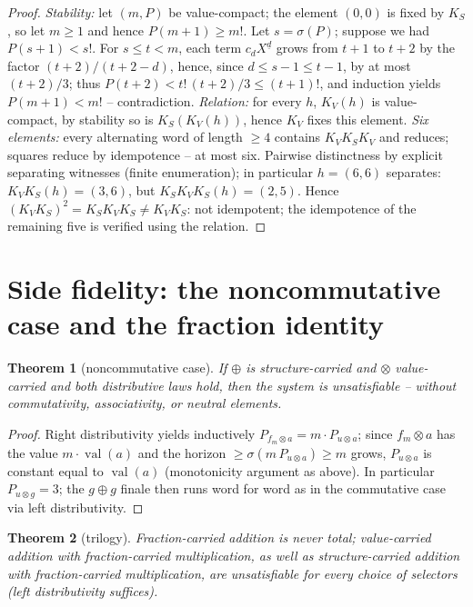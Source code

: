 \documentclass[11pt]{article}
\newtheorem{satz}{Theorem}[section]
\theoremstyle{definition}
\theoremstyle{remark}
\newcommand{\val}{\operatorname{val}}
\newcommand{\ff}[2]{#1^{\underline{#2}}}
\newcommand{\KV}{K_V}
\newcommand{\KS}{K_S}
\begin{document}
\begin{proof}
\emph{Stability:} let $(m,P)$ be value-compact; the element
$(0,0)$ is fixed by $\KS$, so let $m\ge1$ and hence
$P(m{+}1)\ge m!$. Let $s=\sigma(P)$; suppose we had
$P(s{+}1)<s!$. For $s\le t<m$, each term $c_d\ff Xd$ grows from
$t{+}1$ to $t{+}2$ by the factor $(t{+}2)/(t{+}2{-}d)$, hence,
since $d\le s{-}1\le t{-}1$, by at most $(t{+}2)/3$; thus
$P(t{+}2)<t!\,(t{+}2)/3\le(t{+}1)!$, and induction yields
$P(m{+}1)<m!$ -- contradiction.
\emph{Relation:} for every $h$, $\KV(h)$ is value-compact, by
stability so is $\KS(\KV(h))$, hence $\KV$ fixes this element.
\emph{Six elements:} every alternating word of length $\ge4$
contains $\KV\KS\KV$ and reduces; squares reduce by idempotence
-- at most six. Pairwise distinctness by explicit separating
witnesses (finite enumeration); in particular $h=(6,6)$
separates: $\KV\KS(h)=(3,6)$, but $\KS\KV\KS(h)=(2,5)$. Hence
$(\KV\KS)^2=\KS\KV\KS\ne\KV\KS$: not idempotent; the idempotence
of the remaining five is verified using the relation.
\end{proof}


\section{Side fidelity: the noncommutative case and the fraction
identity}\label{app:side}

\begin{satz}[noncommutative case]
If $\oplus$ is structure-carried and $\otimes$ value-carried and
both distributive laws hold, then the system is unsatisfiable --
without commutativity, associativity, or neutral elements.
\end{satz}

\begin{proof}
Right distributivity yields inductively
$P_{f_m\otimes a}=m\cdot P_{u\otimes a}$; since $f_m\otimes a$ has
the value $m\cdot\val(a)$ and the horizon
$\ge\sigma(m\,P_{u\otimes a})\ge m$ grows, $P_{u\otimes a}$ is
constant equal to $\val(a)$ (monotonicity argument as above).
In particular $P_{u\otimes g}=3$; the $g\oplus g$ finale then runs
word for word as in the commutative case via left distributivity.
\end{proof}


\begin{satz}[trilogy]
Fraction-carried addition is never total; value-carried addition
with fraction-carried multiplication, as well as
structure-carried addition with fraction-carried multiplication,
are unsatisfiable for every choice of selectors (left
distributivity suffices).
\end{satz}
\end{document}

